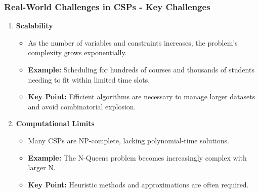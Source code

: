 \documentclass[aspectratio=169]{beamer}
\begin{document}
\begin{frame}[fragile]
    \frametitle{Real-World Challenges in CSPs - Key Challenges}
    \begin{enumerate}
        \item \textbf{Scalability}
            \begin{itemize}
                \item As the number of variables and constraints increases, the problem's complexity grows exponentially.
                \item \textbf{Example:} Scheduling for hundreds of courses and thousands of students needing to fit within limited time slots.
                \item \textbf{Key Point:} Efficient algorithms are necessary to manage larger datasets and avoid combinatorial explosion.
            \end{itemize}
        \item \textbf{Computational Limits}
            \begin{itemize}
                \item Many CSPs are NP-complete, lacking polynomial-time solutions.
                \item \textbf{Example:} The N-Queens problem becomes increasingly complex with larger N.
                \item \textbf{Key Point:} Heuristic methods and approximations are often required.
            \end{itemize}
    \end{enumerate}
\end{frame}
\end{document}
